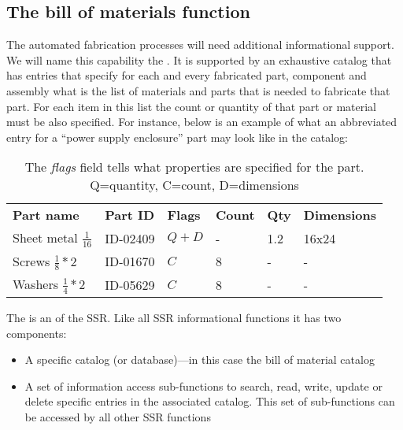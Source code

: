 \subsection[The bill of materials function]{The bill of materials
function}

The automated fabrication
processes will need additional informational support. We will name this
capability the . It is supported by
an exhaustive catalog that has entries that specify for each and every
fabricated part, component and assembly what is the list of materials
and parts that is needed to fabricate that part. For each item in this
list the count or quantity of that part or material must be also
specified. For instance, below is an example of what an abbreviated
entry for a “power supply enclosure” part may look like in the catalog:

\begin{table}[h]
\caption{Example Entries in the Bill of Materials Catalog for the ``Power Supply Enclosure'' part}
\begin{center}
\begin{tabular}{| l l l l l l |}
\hline
\textbf{Part name} &
\textbf{Part ID} &
\textbf{Flags} &
\textbf{Count} &
\textbf{Qty} &
\textbf{Dimensions}\\
Sheet metal $\frac{1}{16}$ &
ID-02409
 &
$Q + D$
 &
- &
1.2
 &
16x24
\\
Screws $\frac{1}{8}*2$ &
ID-01670
 &
$C$
 &
8 &
-
 &
-
\\
Washers $\frac{1}{4}*2$ &
ID-05629
 &
$C$
 &
8 &
-
 &
-
\\\hline
\end{tabular}
\end{center}
\caption*{The \textit{flags} field tells what properties are specified for the part.  Q=quantity, C=count, D=dimensions}
\end{table}

The  is an  of
the SSR. Like all SSR informational functions it has two components:

\begin{itemize}
\item A specific catalog (or database)---in this case the bill of
material catalog
\item A set of information access sub-functions to search, read, write,
update or delete specific entries in the associated catalog. This set
of sub-functions can be accessed by all other SSR functions 
\end{itemize}

